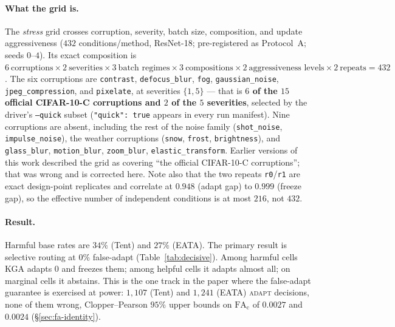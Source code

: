 \paragraph{What the grid is.} The \emph{stress} grid crosses corruption, severity,
batch size, composition, and update aggressiveness ($432$ conditions/method, ResNet-18;
pre-registered as Protocol~A; seeds $0$--$4$). Its exact composition is
$6\ \text{corruptions}\times2\ \text{severities}\times3\ \text{batch regimes}\times3\ \text{compositions}
\times2\ \text{aggressiveness levels}\times2\ \text{repeats}=432$. The six corruptions are
\texttt{contrast}, \texttt{defocus\_blur}, \texttt{fog}, \texttt{gaussian\_noise},
\texttt{jpeg\_compression}, and \texttt{pixelate}, at severities $\{1,5\}$ --- that is
\textbf{$6$ of the $15$ official CIFAR-10-C corruptions and $2$ of the $5$ severities}, selected by
the driver's \texttt{--quick} subset (\texttt{"quick": true} appears in every run manifest). Nine
corruptions are absent, including the rest of the noise family (\texttt{shot\_noise},
\texttt{impulse\_noise}), the weather corruptions (\texttt{snow}, \texttt{frost},
\texttt{brightness}), and \texttt{glass\_blur}, \texttt{motion\_blur}, \texttt{zoom\_blur},
\texttt{elastic\_transform}. Earlier versions of this work described the grid as covering ``the
official CIFAR-10-C corruptions''; that was wrong and is corrected here. Note also that the two
repeats \texttt{r0}/\texttt{r1} are exact design-point replicates and correlate at $0.948$ (adapt
gap) to $0.999$ (freeze gap), so the effective number of independent conditions is at most $216$,
not $432$.

\paragraph{Result.} Harmful base rates are $34\%$ (Tent) and
$27\%$ (EATA). The primary result is selective routing at $0\%$
false-adapt (Table~\ref{tab:decisive}). Among harmful cells \textsc{KGA} adapts $0$ and freezes them;
among helpful cells it adapts almost all; on marginal cells it abstains. This is the one track in
the paper where the false-adapt guarantee is exercised at power: $1{,}107$ (Tent) and $1{,}241$
(EATA) \textsc{adapt} decisions, none of them wrong, Clopper--Pearson $95\%$ upper bounds on
$\mathrm{FA}_{\mathrm c}$ of $0.0027$ and $0.0024$ (\S\ref{sec:fa-identity}).

